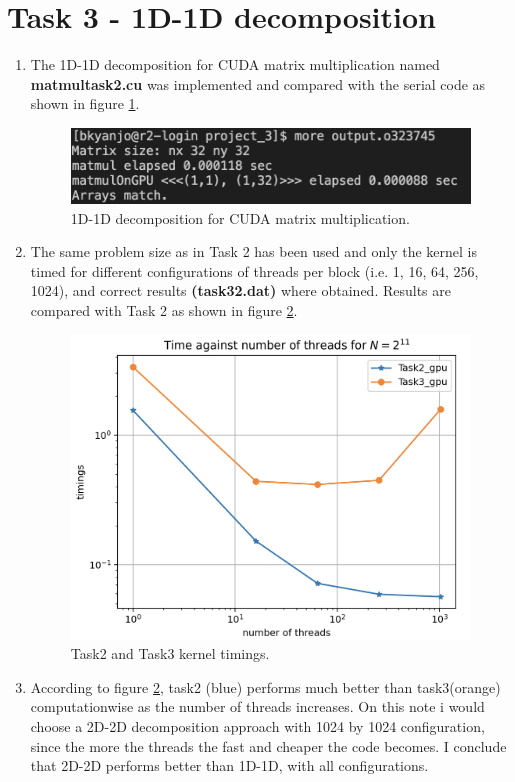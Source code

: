 \documentclass[12pt,a4paper]{article}
\begin{document}
\section*{Task 3 - 1D-1D decomposition}
\begin{enumerate}
	\item The 1D-1D decomposition for CUDA matrix multiplication named \textbf{matmul\textunderscore task2.cu} was implemented and compared with the serial code as shown in figure \ref{fig:t31}. 
	
		\begin{figure}[h]
		\centering
		\includegraphics[width=0.5\linewidth]{"t31"}
		\caption{1D-1D decomposition for CUDA matrix multiplication.}
		\label{fig:t31}
	\end{figure}
	
	\item The same problem size as in Task 2 has been used and only the kernel is timed  for different configurations of threads per block (i.e. 1, 16, 64, 256, 1024), and correct results \textbf{(task3\textunderscore2.dat)} where obtained. Results are compared with Task 2 as shown in  figure \ref{fig:t32}.
	
	\begin{figure}[h]
		\centering
		\includegraphics[width=0.7\linewidth]{"t33"}
		\caption{Task2 and Task3 kernel timings.}
		\label{fig:t32}
	\end{figure}
	
	\item According to figure \ref{fig:t32}, task2 (blue) performs much better than task3(orange) computationwise as the number of threads increases. On this note i would choose a 2D-2D decomposition approach with 1024 by 1024 configuration, since the more the threads the fast and cheaper the code becomes. I conclude that 2D-2D performs better than 1D-1D, with all configurations.
	
\end{enumerate}
\end{document}

